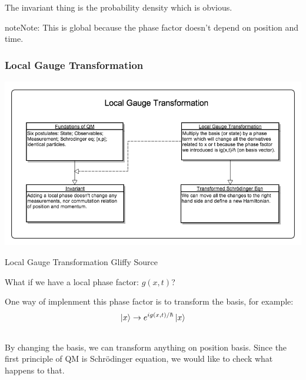 \documentclass[letterpaper,10pt,english]{sphinxmanual}
\newcommand{\ket}[1]{\left| #1\right\rangle}
\begin{document}
The invariant thing is the probability density which is obvious.

\begin{notice}{note}{Note:}
This is global because the phase factor doesn't depend on position and time.
\end{notice}


\subsubsection{Local Gauge Transformation}
\label{symmetries:local-gauge-transformation}
\includegraphics{LocalGaugeTransformation.png}

Local Gauge Transformation Gliffy Source

What if we have a local phase factor: $g(x,t)$?

One way of implenment this phase factor is to transform the basis, for example:
\begin{gather}
\begin{split}\ket{x} \rightarrow e^{i g(x,t)/\hbar} \ket{x}\end{split}\notag\\\begin{split}\end{split}\notag
\end{gather}
By changing the basis, we can transform anything on position basis. Since the first principle of QM is Schrödinger equation, we would like to check what happens to that.
\end{document}
